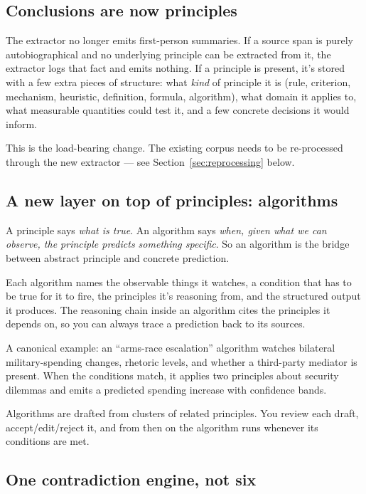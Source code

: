 \documentclass[11pt]{article}
\begin{document}
\subsection{Conclusions are now principles}

The extractor no longer emits first-person summaries. If a source
span is purely autobiographical and no underlying principle can be
extracted from it, the extractor logs that fact and emits nothing.
If a principle is present, it's stored with a few extra pieces of
structure: what \emph{kind} of principle it is (rule, criterion,
mechanism, heuristic, definition, formula, algorithm), what domain
it applies to, what measurable quantities could test it, and a few
concrete decisions it would inform.

This is the load-bearing change. The existing corpus needs to be
re-processed through the new extractor — see
Section~\ref{sec:reprocessing} below.

\subsection{A new layer on top of principles: algorithms}

A principle says \emph{what is true}. An algorithm says \emph{when,
given what we can observe, the principle predicts something
specific}. So an algorithm is the bridge between abstract principle
and concrete prediction.

Each algorithm names the observable things it watches, a condition
that has to be true for it to fire, the principles it's reasoning
from, and the structured output it produces. The reasoning chain
inside an algorithm cites the principles it depends on, so you can
always trace a prediction back to its sources.

A canonical example: an ``arms-race escalation'' algorithm watches
bilateral military-spending changes, rhetoric levels, and whether
a third-party mediator is present. When the conditions match, it
applies two principles about security dilemmas and emits a
predicted spending increase with confidence bands.

Algorithms are drafted from clusters of related principles. You
review each draft, accept/edit/reject it, and from then on the
algorithm runs whenever its conditions are met.

\subsection{One contradiction engine, not six}
\end{document}
